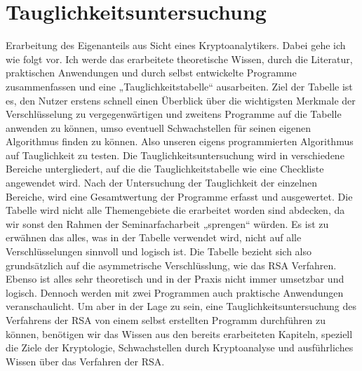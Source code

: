 \section{Tauglichkeitsuntersuchung}
Erarbeitung des Eigenanteils aus Sicht eines Kryptoanalytikers. Dabei gehe ich wie folgt vor. Ich werde das erarbeitete theoretische Wissen, durch die Literatur, praktischen Anwendungen und durch selbst entwickelte Programme zusammenfassen und eine „Tauglichkeitstabelle“ ausarbeiten. Ziel der Tabelle ist es, den Nutzer erstens schnell einen Überblick über die wichtigsten Merkmale der Verschlüsselung zu vergegenwärtigen und zweitens Programme auf die Tabelle anwenden zu können, umso eventuell Schwachstellen für seinen eigenen Algorithmus finden zu können. Also unseren eigens programmierten Algorithmus auf Tauglichkeit zu testen. Die Tauglichkeitsuntersuchung wird in verschiedene Bereiche untergliedert, auf die die Tauglichkeitstabelle wie eine Checkliste angewendet wird. Nach der Untersuchung der Tauglichkeit der einzelnen Bereiche, wird eine Gesamtwertung der Programme erfasst und ausgewertet. Die Tabelle wird nicht alle Themengebiete die erarbeitet worden sind abdecken, da wir sonst den Rahmen der Seminarfacharbeit „sprengen“ würden. Es ist zu erwähnen das alles, was in der Tabelle verwendet wird, nicht auf alle Verschlüsselungen sinnvoll und logisch ist. Die Tabelle bezieht sich also grundsätzlich auf die asymmetrische Verschlüsslung, wie das RSA Verfahren. Ebenso ist alles sehr theoretisch und in der Praxis nicht immer umsetzbar und logisch. Dennoch werden mit zwei Programmen auch praktische Anwendungen veranschaulicht. Um aber in der Lage zu sein, eine Tauglichkeitsuntersuchung des Verfahrens der RSA von einem selbst erstellten Programm durchführen zu können, benötigen wir das Wissen aus den bereits erarbeiteten Kapiteln, speziell die Ziele der Kryptologie, Schwachstellen durch Kryptoanalyse und ausführliches Wissen über das Verfahren der RSA. \\
